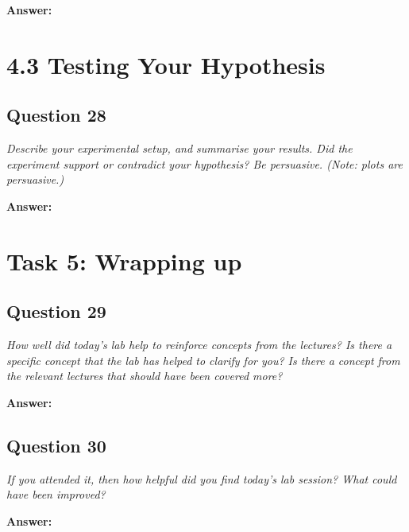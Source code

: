 \documentclass[a4paper]{article}
\begin{document}
\textbf{Answer:}

\section*{4.3 Testing Your Hypothesis}

\subsection*{Question 28}
\emph{Describe your experimental setup, and summarise your results.
Did the experiment support or contradict your hypothesis? Be persuasive. (Note: plots are persuasive.)}

\textbf{Answer:}

\section*{Task 5: Wrapping up}

\subsection*{Question 29}
\emph{How well did today's lab help to reinforce concepts from the
lectures? Is there a specific concept that the lab has helped to clarify for you? Is there a concept from the relevant lectures that should have been covered more?}

\textbf{Answer:}

\subsection*{Question 30}
\emph{If you attended it, then how helpful did you find today's lab
session? What could have been improved?}

\textbf{Answer:}
\end{document}

